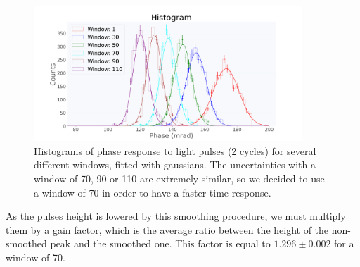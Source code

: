\documentclass[12pt]{article}
\begin{document}
\begin{figure}[H]
\centering
\includegraphics[width=0.9\textwidth]{choose_window.png}
\caption{Histograms of phase response to light pulses (2 cycles) for several different windows, fitted with gaussians. The uncertainties with a window of 70, 90 or 110 are extremely similar, so we decided to use a window of 70 in order to have a faster time response.}
\end{figure}
As the pulses height is lowered by this smoothing procedure, we must multiply them by a gain factor, which is the average ratio between the height of the non-smoothed peak and the smoothed one. This factor is equal to $1.296 \pm 0.002$ for a window of 70.
\end{document}
